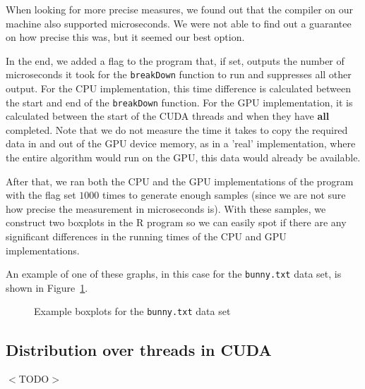 When looking for more precise measures, we found out that the compiler on our machine also supported microseconds.
We were not able to find out a guarantee on how precise this was, but it seemed our best option.

In the end, we added a flag to the program that, if set, outputs the number of microseconds it took for the \texttt{breakDown} function to run and suppresses all other output.
For the CPU implementation, this time difference is calculated between the start and end of the \texttt{breakDown} function.
For the GPU implementation, it is calculated between the start of the CUDA threads and when they have \textbf{all} completed.
Note that we do not measure the time it takes to copy the required data in and out of the GPU device memory, as in a 'real' implementation, where the entire algorithm would run on the GPU, this data would already be available.

After that, we ran both the CPU and the GPU implementations of the program with the flag set $1000$ times to generate enough samples (since we are not sure how precise the measurement in microseconds is).
With these samples, we construct two boxplots in the R program so we can easily spot if there are any significant differences in the running times of the CPU and GPU implementations.

An example of one of these graphs, in this case for the \texttt{bunny.txt} data set, is shown in Figure~\ref{fig:bunny_box}.

\begin{figure}
	\caption{Example boxplots for the \texttt{bunny.txt} data set}
	\label{fig:bunny_box}
\end{figure}

\subsection{Distribution over threads in CUDA}
$<$TODO$>$
